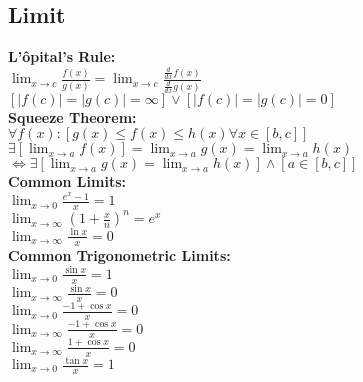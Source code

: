 \documentclass[12pt]{article}
\begin{document}
\subsection*{Limit}
\textbf{L'\^{o}pital's Rule:}
    \\ \( \displaystyle\lim_{x \rightarrow{c}} { \displaystyle\frac{ f( x ) }{ g( x ) } } = \displaystyle\lim_{x \rightarrow{c}} { \displaystyle\frac{ \frac{ d }{ dx } f( x ) }{ \frac{ d }{ dx } g( x ) } }  \)
    \\ \( [ | f( c) | = | g( c ) | = \infty] \lor [ | f( c) | = | g( c ) | = 0] \)
\\ \textbf{Squeeze Theorem:}
    \\ \( \forall f( x ) : [ g( x )\le f( x ) \le h( x ) \forall x \in [ b, c ] ] \)
    \\ \( \exists [ \displaystyle\lim_{x \rightarrow{a}} { f( x ) } ] = \displaystyle\lim_{x \rightarrow{a}} { g( x ) } = \displaystyle\lim_{x \rightarrow{a}} { h( x ) } \)
    \\ \( \iff \exists [ \displaystyle\lim_{x \rightarrow{a}} { g( x ) } = \displaystyle\lim_{x \rightarrow{a}} { h( x ) } ] \land [a \in [ b, c ]] \)
\\ \textbf{Common Limits: }
    \\ \( \displaystyle\lim_{x \rightarrow{0} } { \displaystyle\frac{ e^x - 1 }{ x } } = 1 \)
    \\ \( \displaystyle\lim_{x \rightarrow{\infty}} { \left( 1 + \displaystyle\frac{ x }{ n } \right)^n } = e^x \)
    \\ \( \displaystyle\lim_{x \rightarrow{\infty}} { \displaystyle\frac{ \ln x }{ x } } = 0 \)
\\ \textbf{Common Trigonometric Limits:}
    \\ \( \displaystyle\lim_{x \rightarrow{0}} { \displaystyle\frac{ \sin x }{ x } } = 1 \)
    \\ \( \displaystyle\lim_{x \rightarrow{\infty}} { \displaystyle\frac{ \sin x }{ x } } = 0 \)
    \\ \( \displaystyle\lim_{x \rightarrow{0}} { \displaystyle\frac{ -1 + \cos x }{ x } } = 0 \)
    \\ \( \displaystyle\lim_{x \rightarrow{\infty}} { \displaystyle\frac{ -1 + \cos x }{ x } } = 0 \)
    \\ \( \displaystyle\lim_{x \rightarrow{\infty}} { \displaystyle\frac{ 1 + \cos x }{ x } } = 0 \)
    \\ \( \displaystyle\lim_{x \rightarrow{0}} { \displaystyle\frac{ \tan x }{ x } } = 1 \)
\end{document}
